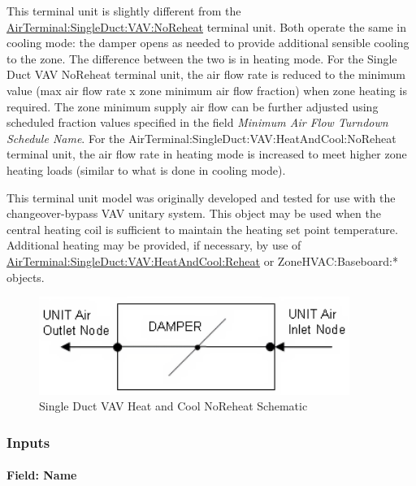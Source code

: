 This terminal unit is slightly different from the \hyperref[airterminalsingleductvavnoreheat]{AirTerminal:SingleDuct:VAV:NoReheat} terminal unit. Both operate the same in cooling mode: the damper opens as needed to provide additional sensible cooling to the zone. The difference between the two is in heating mode. For the Single Duct VAV NoReheat terminal unit, the air flow rate is reduced to the minimum value (max air flow rate x zone minimum air flow fraction) when zone heating is required. The zone minimum supply air flow can be further adjusted using scheduled fraction values specified in the field \textit{Minimum Air Flow Turndown Schedule Name}. For the AirTerminal:SingleDuct:VAV:HeatAndCool:NoReheat terminal unit, the air flow rate in heating mode is increased to meet higher zone heating loads (similar to what is done in cooling mode).

This terminal unit model was originally developed and tested for use with the changeover-bypass VAV unitary system. This object may be used when the central heating coil is sufficient to maintain the heating set point temperature. Additional heating may be provided, if necessary, by use of \hyperref[airterminalsingleductvavheatandcoolreheat]{AirTerminal:SingleDuct:VAV:HeatAndCool:Reheat} or ZoneHVAC:Baseboard:* objects.

\begin{figure}[hbtp] %
\centering
\includegraphics[width=0.9\textwidth, height=0.9\textheight, keepaspectratio=true]{media/image268.png}
\caption{Single Duct VAV Heat and Cool NoReheat Schematic \protect \label{fig:single-duct-vav-heat-and-cool-noreheat}}
\end{figure}

\subsubsection{Inputs}\label{inputs-6-000}

\paragraph{Field: Name}\label{field-name-6-000}

